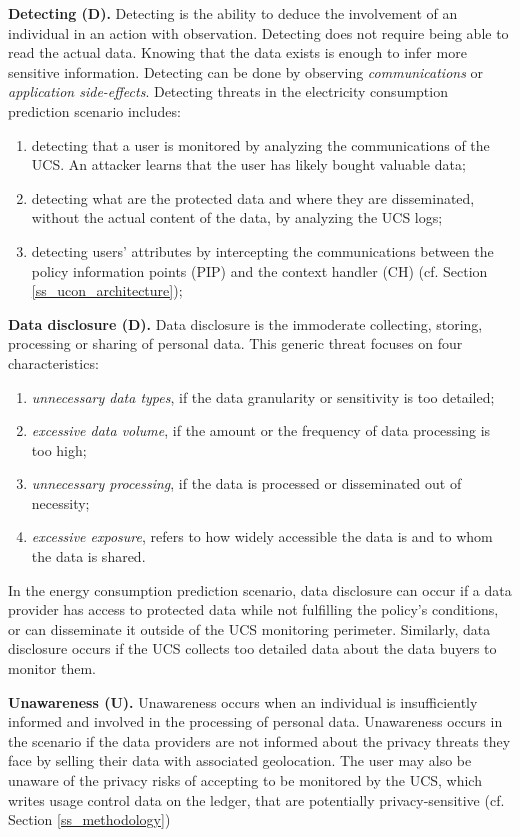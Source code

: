 \textbf{Detecting (D).} Detecting is the ability to deduce the involvement of an individual in an action with observation. Detecting does not require being able to read the actual data. Knowing that the data exists is enough to infer more sensitive information. Detecting can be done by observing \emph{communications} or \emph{application side-effects}. Detecting threats in the electricity consumption prediction scenario includes: 
\begin{enumerate}
    \item detecting that a user is monitored by analyzing the communications of the UCS. An attacker learns that the user has likely bought valuable data;
    \item detecting what are the protected data and where they are disseminated, without the actual content of the data, by analyzing the UCS logs;
    \item detecting users' attributes by intercepting the communications between the policy information points (PIP) and the context handler (CH) (cf. Section \ref{ss_ucon_architecture});
\end{enumerate}

\textbf{Data disclosure (D).} Data disclosure is the
immoderate collecting, storing, processing or sharing of personal data. This generic threat focuses on four characteristics:
\begin{enumerate}
    \item \emph{unnecessary data types}, if the data granularity or sensitivity is too detailed;
    \item \emph{excessive data volume}, if the amount or the frequency of data processing is too high;
    \item \emph{unnecessary processing}, if the data is processed or disseminated out of necessity;
    \item \emph{excessive exposure}, refers to how widely accessible the data is and to whom the data is shared.
\end{enumerate}

In the energy consumption prediction scenario, data disclosure can occur if a data provider has access to protected data while not fulfilling the policy's conditions, or can disseminate it outside of the UCS monitoring perimeter. Similarly, data disclosure occurs if the UCS collects too detailed data about the data buyers to monitor them.

\textbf{Unawareness (U).} Unawareness occurs when an individual is insufficiently informed and involved in the processing of personal data.
Unawareness occurs in the scenario if the data providers are not informed about the privacy threats they face by
selling their data with associated geolocation. The user may also be unaware of the privacy risks of accepting to be monitored by the UCS, which writes usage control data on the ledger, that are potentially privacy-sensitive (cf. Section \ref{ss_methodology}) 

